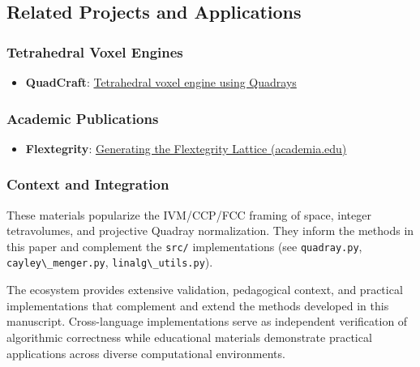 \documentclass[
  10pt,
]{article}
\newcommand{\passthrough}[1]{#1}
\providecommand{\tightlist}{%
  \setlength{\itemsep}{0pt}\setlength{\parskip}{0pt}}
\begin{document}
\subsection{Related Projects and
Applications}\label{related-projects-and-applications}

\subsubsection{Tetrahedral Voxel
Engines}\label{tetrahedral-voxel-engines}

\begin{itemize}
\tightlist
\item
  \textbf{QuadCraft}:
  \href{https://github.com/docxology/quadcraft/}{Tetrahedral voxel
  engine using Quadrays}
\end{itemize}

\subsubsection{Academic Publications}\label{academic-publications}

\begin{itemize}
\tightlist
\item
  \textbf{Flextegrity}:
  \href{https://www.academia.edu/44531954/Generating_the_Flextegrity_Lattice}{Generating
  the Flextegrity Lattice (academia.edu)}
\end{itemize}

\subsubsection{Context and Integration}\label{context-and-integration}

These materials popularize the IVM/CCP/FCC framing of space, integer
tetravolumes, and projective Quadray normalization. They inform the
methods in this paper and complement the \passthrough{\lstinline!src/!}
implementations (see \passthrough{\lstinline!quadray.py!},
\passthrough{\lstinline!cayley\_menger.py!},
\passthrough{\lstinline!linalg\_utils.py!}).

The ecosystem provides extensive validation, pedagogical context, and
practical implementations that complement and extend the methods
developed in this manuscript. Cross-language implementations serve as
independent verification of algorithmic correctness while educational
materials demonstrate practical applications across diverse
computational environments.
\end{document}
